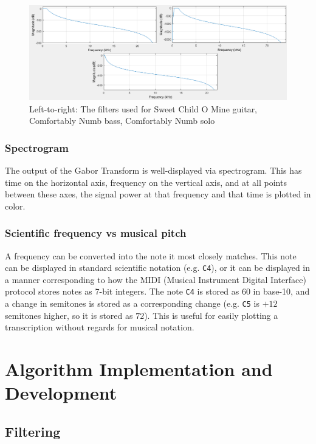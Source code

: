\documentclass{article}
\begin{document}
\begin{figure}[!t]
	\centering
	\includegraphics[width=\linewidth]{filters}    	
	\caption{Left-to-right: The filters used for Sweet Child O Mine guitar, Comfortably Numb bass, Comfortably Numb solo}
	\label{fig:filters}
\end{figure}

\subsubsection{Spectrogram}

The output of the Gabor Transform is well-displayed via spectrogram. This has time on the horizontal axis, frequency on the vertical axis, and at all points between these axes, the signal power at that frequency and that time is plotted in color.

\subsubsection{Scientific frequency vs musical pitch}
A frequency can be converted into the note it most closely matches. This note can be displayed in standard scientific notation (e.g. \texttt{C4}), or it can be displayed in a manner corresponding to how the MIDI (Musical Instrument Digital Interface) protocol stores notes as 7-bit integers. The note \texttt{C4} is stored as $60$ in base-10, and a change in semitones is stored as a corresponding change (e.g. \texttt{C5} is $+12$ semitones higher, so it is stored as $72$). This is useful for easily plotting a transcription without regards for musical notation.


\section{Algorithm Implementation and Development}


\subsection{Filtering}
\end{document}
